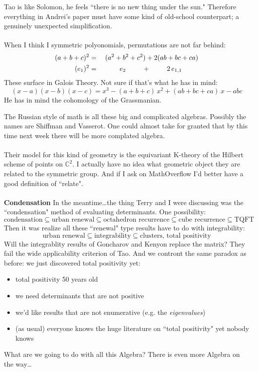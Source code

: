 \documentclass[12pt]{article}
\begin{document}
Tao is like Solomon, he feels ``there is no new thing under the sun." Therefore everything in Andrei's paper must have some kind of old-school counterpart; a genuinely unexpected simplification. \\ \\
When I think I symmetric polyonomials, permutations are not far behind:
\begin{eqnarray*} (a+b+c)^2 &=& (a^2 + b^2 + c^2) + 2(ab+bc+ca) \\
(e_1)^2 &=& \hspace{2.4em}e_2\hspace{2.4em} + \hspace{2.4em}2 \,e_{1,1}\hspace{2.4em} \end{eqnarray*}
These surface in Galois Theory.  Not sure if that's what he has in mind:
$$ (x-a)(x-b)(x-c) = x^3 - (a+b+c)\,x^2 + (ab+bc+ca)\,x -abc $$
He has in mind the cohomology of the Grassmanian. 

\newpage

\noindent The Russian style of math is all these big and complicated algebras.  Possibly the names are Shiffman and Vasserot. One could almost take for granted that by this time next week there will be more complated algebra. \\ \\
Their model for this kind of geometry is the equivariant K-theory of the Hilbert scheme of points on $\mathbb{C}^2$.  I actually have no idea what geometric object they are related to the symmetric group.  And if I ask on MathOverflow I'd better have a good definition of ``relate". \\ \\
\textbf{Condensation}  In the meantime\dots the thing Terry and I were discussing was the ``condensation" method of evaluating determinants.   One possibility:
$$ \text{condensation} \subseteq \text{urban renewal} \subseteq \text{octahedron recurrence} \subseteq \text{cube recurrence} \subseteq \text{TQFT} $$
Then it was realize all these ``renewal" type results have to do with integrability:
$$ \text{urban renewal} \subseteq \text{integrability} \subseteq \text{clusters, total positivity}$$
Will the integrablity results of Goncharov and Kenyon replace the matrix?  They fail the {\color{black!50!white}wide applicability} criterion of Tao.  And we contront the same paradox as before: we just discovered total positivity yet:
\begin{itemize}
\item total positivity 50 years old
\item we need determinants that are not positive
\item we'd like results that are not enumerative (e.g. the \textit{eigenvalues})
\item (as usual) everyone knows the huge literature on ``total positivity" yet nobody knows
\end{itemize}
What are we going to do with all this Algebra?  There is even more Algebra on the way\dots
\end{document}

